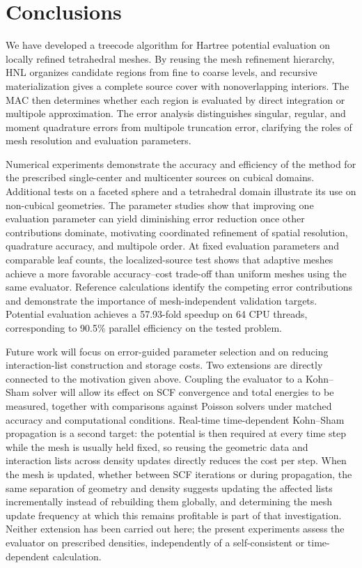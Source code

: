 \documentclass[a4paper,pdflatex,sn-mathphys-num]{sn-jnl}
\theoremstyle{thmstyleone}
\begin{document}
\section{Conclusions}
\label{sec:conclusions}

We have developed a treecode algorithm for Hartree potential evaluation on locally refined tetrahedral meshes. By reusing the mesh refinement hierarchy, HNL organizes candidate regions from fine to coarse levels, and recursive materialization gives a complete source cover with nonoverlapping interiors. The MAC then determines whether each region is evaluated by direct integration or multipole approximation. The error analysis distinguishes singular, regular, and moment quadrature errors from multipole truncation error, clarifying the roles of mesh resolution and evaluation parameters.

Numerical experiments demonstrate the accuracy and efficiency of the method for the prescribed single-center and multicenter sources on cubical domains. Additional tests on a faceted sphere and a tetrahedral domain illustrate its use on non-cubical geometries. The parameter studies show that improving one evaluation parameter can yield diminishing error reduction once other contributions dominate, motivating coordinated refinement of spatial resolution, quadrature accuracy, and multipole order. At fixed evaluation parameters and comparable leaf counts, the localized-source test shows that adaptive meshes achieve a more favorable accuracy--cost trade-off than uniform meshes using the same evaluator. Reference calculations identify the competing error contributions and demonstrate the importance of mesh-independent validation targets. Potential evaluation achieves a 57.93-fold speedup on 64 CPU threads, corresponding to 90.5\% parallel efficiency on the tested problem.

Future work will focus on error-guided parameter selection and on reducing
interaction-list construction and storage costs. Two extensions are directly
connected to the motivation given above. Coupling the evaluator to a Kohn--Sham
solver will allow its effect on SCF convergence and total energies to be
measured, together with comparisons against Poisson solvers under matched
accuracy and computational conditions. Real-time time-dependent Kohn--Sham
propagation is a second target: the potential is then required at every time
step while the mesh is usually held fixed, so reusing the geometric data and
interaction lists across density updates directly reduces the cost per step.
When the mesh is updated, whether between SCF iterations or during propagation,
the same separation of geometry and density suggests updating the affected lists
incrementally instead of rebuilding them globally, and determining the mesh
update frequency at which this remains profitable is part of that investigation.
Neither extension has been carried out here; the present experiments assess the
evaluator on prescribed densities, independently of a self-consistent or
time-dependent calculation.
\end{document}
